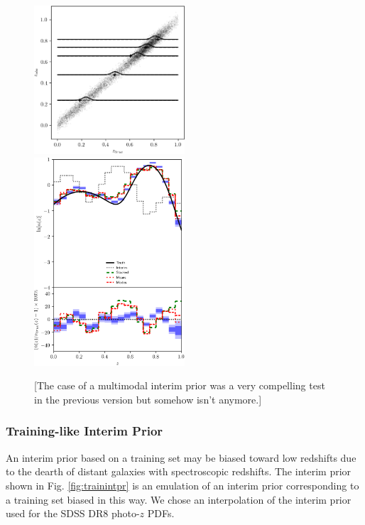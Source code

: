 \documentclass[iop]{emulateapj}
\begin{document}
\begin{figure}
	\begin{center}
		
\includegraphics[width=0.5\textwidth]{fig/template_prior/scatter.png}\\
		
\includegraphics[width=0.5\textwidth]{fig/template_prior/estimators.png}	
		\caption{[The case of a multimodal interim prior was a very 
compelling test in the previous version but somehow isn't anymore.]}
		\label{fig:tempintpr}
	\end{center}
\end{figure}

\subsubsection{Training-like Interim Prior}
\label{sec:trainintpr}

An interim prior based on a training set may be biased toward low redshifts due 
to the dearth of distant galaxies with spectroscopic redshifts.  The interim 
prior shown in Fig. \ref{fig:trainintpr} is an emulation of an interim prior 
corresponding to a training set biased in this way.  We chose an interpolation 
of the interim prior used for the SDSS DR8 photo-$z$ PDFs.  
\end{document}
